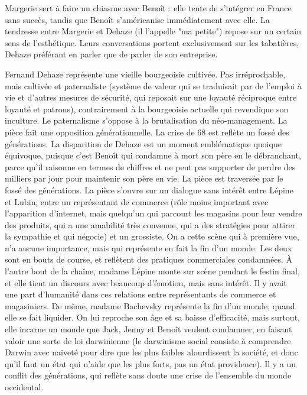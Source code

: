 \documentclass[a4paper,12pt]{book}
\begin{document}
\par Margerie sert à faire un chiasme avec Benoît : elle tente de s'intégrer en France sans succès, tandis que Benoît s'américanise immédiatement avec elle. La tendresse entre Margerie et Dehaze (il l'appelle "ma petite") repose sur un certain sens de l'esthétique. Leurs conversations portent exclusivement sur les tabatières, Dehaze préférant en parler que de parler de son entreprise.
\par Fernand Dehaze représente une vieille bourgeoisie cultivée. Pas irréprochable, mais cultivée et paternaliste (système de valeur qui se traduisait par de l'emploi à vie et d'autres mesures de sécurité, qui reposait sur une loyauté réciproque entre loyauté et patrons), contrairement à la bourgeoisie actuelle qui revendique son inculture. Le paternalisme s'oppose à la brutalisation du néo-management. La pièce fait une opposition générationnelle. La crise de 68 est reflète un fossé des générations. La disparition de Dehaze est un moment emblématique quoique équivoque, puisque c'est Benoît qui condamne à mort son père en le débranchant, parce qu'il raisonne en termes de chiffres et ne peut pas supporter de perdre des milliers par jour pour maintenir son père en vie. La pièce est traversée par le fossé des générations. La pièce s'ouvre sur un dialogue sans intérêt entre Lépine et Lubin, entre un représentant de commerce (rôle moins important avec l'apparition d'internet, mais quelqu'un qui parcourt les magasins pour leur vendre des produits, qui a une amabilité très convenue, qui a des stratégies pour attirer la sympathie et qui négocie) et un grossiste. On a cette scène qui à première vue, n'a aucune importance, mais qui représente en fait la fin d'un monde. Les deux sont en bouts de course, et reflètent des pratiques commerciales condamnées. À l'autre bout de la chaîne, madame Lépine monte sur scène pendant le festin final, et elle tient un discours avec beaucoup d'émotion, mais sans intérêt. Il y avait une part d'humanité dans ces relations entre représentants de commerce et magasiniers. De même, madame Bachevsky représente la fin d'un monde, quand elle se fait liquider. On lui reproche son âge et sa baisse d'efficacité, mais surtout, elle incarne un monde que Jack, Jenny et Benoît veulent condamner, en faisant valoir une sorte de loi darwinienne (le darwinisme social consiste à comprendre Darwin avec naïveté pour dire que les plus faibles alourdissent la société, et donc qu'il faut un état qui n'aide que les plus forts, pas un état providence). Il y a un conflit des générations, qui reflète sans doute une crise de l'ensemble du monde occidental.
\end{document}
